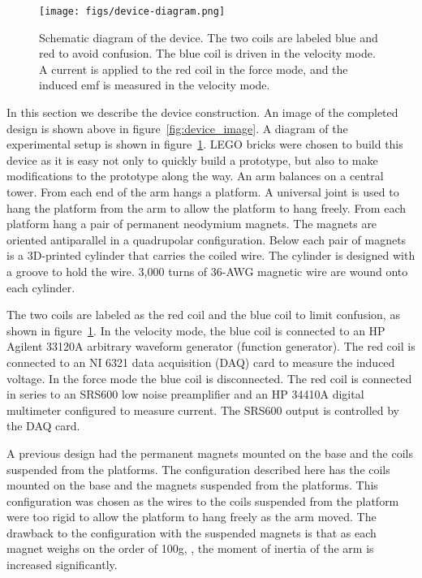 \documentclass[aps,prstab,reprint,12pt]{revtex4-1}
\begin{document}
\begin{figure}[t]
    \centering
    \texttt{[image: figs/device-diagram.png]}
    \caption{Schematic diagram of the device. The two coils are labeled blue and red to avoid confusion. The blue coil is driven in the velocity mode. A current is applied to the red coil in the force mode, and the induced emf is measured in the velocity mode.}
    \label{fig:device_diagram}
\end{figure}


In this section we describe the device construction. An image of the completed design is shown above in figure~\ref{fig:device_image}. A diagram of the experimental setup is shown in figure~\ref{fig:device_diagram}.
LEGO bricks were chosen to build this device as it is easy not only to quickly build a prototype, but also to make modifications to the prototype along the way. An arm balances on a central tower.
From each end of the arm hangs a platform. A universal joint is used to hang the platform from the arm to allow the platform to hang freely. From each platform hang a pair of permanent neodymium magnets.
The magnets are oriented antiparallel in a quadrupolar configuration. Below each pair of magnets is a 3D-printed cylinder that carries the coiled wire.
The cylinder is designed with a groove to hold the wire. 3,000 turns of 36-AWG magnetic wire are wound onto each cylinder.

The two coils are labeled as the red coil and the blue coil to limit confusion, as shown in figure~\ref{fig:device_diagram}. In the velocity mode, the blue coil is connected to an HP Agilent 33120A arbitrary waveform generator (function generator). The red coil is connected to an NI 6321 data acquisition (DAQ) card to measure the induced voltage. In the force mode the blue coil is disconnected. The red coil is connected in series to an SRS600 low noise preamplifier and an HP 34410A digital multimeter configured to measure current. The SRS600 output is controlled by the DAQ card.

A previous design had the permanent magnets mounted on the base and the coils suspended from the platforms. The configuration described here has the coils mounted on the base and the magnets suspended from the platforms. This configuration was chosen as the wires to the coils suspended from the platform were too rigid to allow the platform to hang freely as the arm moved. The drawback to the configuration with the suspended magnets is that as each magnet weighs on the order of 100g,
, the moment of inertia of the arm is increased significantly.
\end{document}

